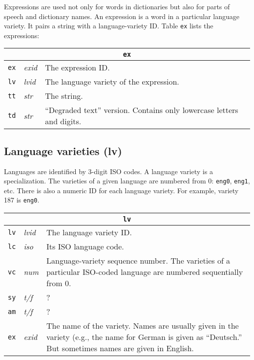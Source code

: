 Expressions are used not only for words in dictionaries but also for
parts of speech and dictionary names.
An expression is a word in a particular language variety.  It pairs a
string with a language-variety ID.  Table {\tt ex} lists the expressions:
\begin{trivlist}\item
\begin{tabular}{|llp{3.5in}|}
\hline
\multicolumn{3}{|c|}{\tt ex}\\
\hline
{\tt ex} & {\it exid} & The expression ID.\\
{\tt lv} & {\it lvid} & The language variety of the expression.\\
{\tt tt} & {\it str} & The string.\\
{\tt td} & {\it str} & ``Degraded text'' version.  Contains only lowercase
letters and digits.\\
\hline
\end{tabular}
\end{trivlist}

\subsection{Language varieties (lv)}

Languages are identified by 3-digit ISO codes.  A language variety is
a specialization.  The varieties of a given language are numbered from
0: {\tt eng0}, {\tt eng1}, etc.  There is also a numeric ID for each
language variety.  For example, variety 187 is {\tt eng0}.
\begin{trivlist}\item
\begin{tabular}{|llp{3.5in}|}
\hline
\multicolumn{3}{|c|}{\tt lv}\\
\hline
{\tt lv} & {\it lvid} & The language variety ID.\\
{\tt lc} & {\it iso} & Its ISO language code.\\
{\tt vc} & {\it num} & Language-variety sequence number.  The varieties of a
    particular ISO-coded language are numbered sequentially from 0.\\
{\tt sy} & {\it t/f} & ?\\
{\tt am} & {\it t/f} & ?\\
{\tt ex} & {\it exid} & The name of the variety.  Names are usually given in
    the variety (e.g., the name for German is given as ``Deutsch.''
    But sometimes names are given in English.\\
\hline
\end{tabular}
\end{trivlist}

